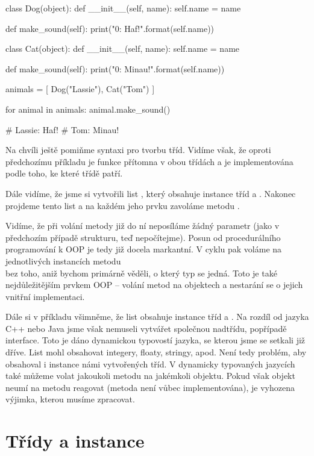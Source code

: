 \begin{python}
class Dog(object):
    def __init__(self, name):
        self.name = name

    def make_sound(self):
        print("{0}: Haf!".format(self.name))


class Cat(object):
    def __init__(self, name):
        self.name = name

    def make_sound(self):
        print("{0}: Minau!".format(self.name))

animals = [ Dog("Lassie"), Cat("Tom") ]

for animal in animals:
     animal.make_sound()

# Lassie: Haf!
# Tom: Minau!
\end{python}

Na chvíli ještě pomiňme syntaxi pro tvorbu tříd. Vidíme však, že oproti předchozímu příkladu je funkce
 přítomna v obou třídách a je implementována podle toho, ke které třídě patří.

Dále vidíme, že jsme si vytvořili list , který obsahuje instance tříd  a .
Nakonec projdeme tento list a na každém jeho prvku zavoláme metodu .

Vidíme, že při volání metody  již do ní neposíláme žádný parametr (jako v předchozím případě
strukturu,  teď nepočítejme).
Posun od procedurálního programování k OOP je tedy již docela markantní. V cyklu 
pak voláme na jednotlivých instancích metodu 
\\
 bez toho, aniž bychom primárně věděli, o který
typ se jedná. Toto je také nejdůležitějším prvkem OOP -- volání metod na objektech a nestarání se o jejich
vnitřní implementaci.

Dále si v příkladu všimněme, že list  obsahuje instance tříd  a . Na rozdíl
od jazyka C++ nebo Java jsme však nemuseli vytvářet společnou nadtřídu, popřípadě interface. Toto je dáno
dynamickou typovostí jazyka, se kterou jsme se setkali již dříve. List mohl obsahovat integery, floaty,
stringy, apod. Není tedy problém, aby obsahoval i instance námi vytvořených tříd. V dynamicky typovaných
jazycích také můžeme volat jakoukoli metodu na jakémkoli objektu. Pokud však objekt neumí na metodu reagovat
(metoda není vůbec implementována), je vyhozena výjimka, kterou musíme zpracovat.


\section{Třídy a instance}

